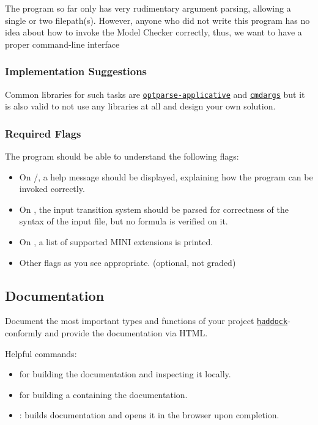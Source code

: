 \documentclass{article}
\begin{document}
The program so far only has very rudimentary argument parsing, allowing a single or two filepath(s). However, anyone who did not write this program has no idea about how to invoke the Model Checker correctly, thus, we want to have a proper command-line interface

\subsubsection*{Implementation Suggestions}

Common libraries for such tasks are \href{https://hackage.haskell.org/package/optparse-applicative}{\texttt{optparse-applicative}} 
and \href{https://hackage.haskell.org/package/cmdargs}{\texttt{cmdargs}} but it is also valid to not use any libraries at all 
and design your own solution.

\subsubsection*{Required Flags}

The program should be able to understand the following flags:

\begin{itemize}
\item On /, a help message should be displayed, explaining how the program can be invoked correctly.
\item On , the input transition system should be parsed for correctness of the syntax of the input file, but no formula is verified on it.
\item On , a list of supported MINI extensions is printed.
\item Other flags as you see appropriate. (optional, not graded)
\end{itemize}

\subsection{Documentation}

Document the most important types and functions of your project \href{https://haskell-haddock.readthedocs.io/en/latest/markup.html}{\texttt{haddock}}-conformly and provide the documentation via HTML.

Helpful commands:

\begin{itemize}
\item {} for building the documentation and inspecting it locally.
\item {} for building a  containing the documentation.
\item {}: builds documentation and opens it in the browser upon completion.
\end{itemize}
\end{document}
